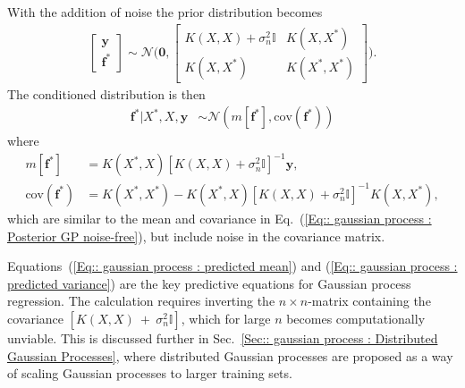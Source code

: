 \documentclass[twoside,english]{uiofysmaster}
\begin{document}
{{With the addition of noise the prior distribution becomes
\begin{align}
\begin{bmatrix}
\textbf{y}\\
\textbf{f}^*
\end{bmatrix}
\sim 
\mathcal{N} \Bigg(
\boldsymbol{0},
\begin{bmatrix}
K(X, X) + \sigma_n^2 \mathbb{I} & K(X, X^*)\\
K(X, X^*) & K(X^*, X^*)
\end{bmatrix}
 \Bigg).
\end{align}
The conditioned distribution is then 
\begin{align}
\textbf{f}^* \big| X^*, X, \textbf{y} & \sim \mathcal{N}(m[\textbf{f}^*], \text{cov}(\textbf{f}^*))
\end{align}
where
\begin{align}
m[\textbf{f}^*] &= K(X^*, X) [K(X, X) + \sigma_n^2 \mathbb{I}]^{-1} \textbf{y},\label{Eq:: gaussian process : predicted mean}\\ 
\text{cov} (\textbf{f}^*) &= K(X^*, X^*) - K(X^*, X)[K(X, X) + \sigma_n^2 \mathbb{I}]^{-1} K(X, X^*), \label{Eq:: gaussian process : predicted variance}
\end{align}
which are similar to the mean and covariance in Eq.~(\ref{Eq:: gaussian process : Posterior GP noise-free}), but include noise in the covariance matrix. 

Equations~(\ref{Eq:: gaussian process : predicted mean}) and (\ref{Eq:: gaussian process : predicted variance}) are the key predictive equations for Gaussian process regression. The calculation requires inverting the $n \times n$-matrix containing the covariance $[K(X,X)~+~\sigma_n^2 \mathbb{I}]$, which for large $n$ becomes computationally unviable. This is discussed further in Sec.~\ref{Sec:: gaussian process : Distributed Gaussian Processes}, where distributed Gaussian processes are proposed as a way of scaling Gaussian processes to larger training sets.

}}
\end{document}
